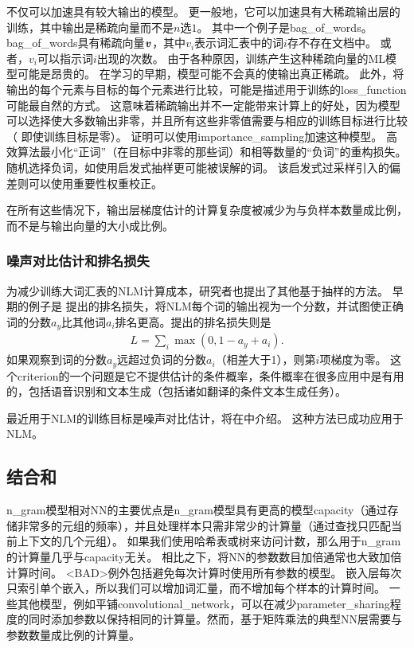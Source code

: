 不仅可以加速具有较大输出的模型。
更一般地，它可以加速具有大稀疏输出层的训练，其中输出是稀疏向量而不是$n$选$1$。
其中一个例子是\gls{bag_of_words}。
\gls{bag_of_words}具有稀疏向量$\boldsymbol{\mathit{v}}$，其中$v_i$表示词汇表中的词$i$存不存在文档中。
或者，$v_i$可以指示词$i$出现的次数。
由于各种原因，训练产生这种稀疏向量的\gls{ML}模型可能是昂贵的。
在学习的早期，模型可能不会真的使输出真正稀疏。
此外，将输出的每个元素与目标的每个元素进行比较，可能是描述用于训练的\gls{loss_function}可能最自然的方式。
这意味着稀疏输出并不一定能带来计算上的好处，因为模型可以选择使大多数输出非零，并且所有这些非零值需要与相应的训练目标进行比较（ 即使训练目标是零）。
\citet{Dauphin2011-small} 证明可以使用\gls{importance_sampling}加速这种模型。
高效算法最小化``正词''（在目标中非零的那些词）和相等数量的``负词''的重构损失。
随机选择负词，如使用启发式抽样更可能被误解的词。
该启发式过采样引入的偏差则可以使用重要性权重校正。


在所有这些情况下，输出层梯度估计的计算复杂度被减少为与负样本数量成比例，而不是与输出向量的大小成比例。


\subsubsection{噪声对比估计和排名损失}


\label{sec:combining_neural_language_models_with_n_grams}
为减少训练大词汇表的\gls{NLM}计算成本，研究者也提出了其他基于抽样的方法。
早期的例子是 \citet{Collobert+Weston-ICML2008}提出的排名损失，将\gls{NLM}每个词的输出视为一个分数，并试图使正确词的分数$a_y$比其他词$a_i$排名更高。提出的排名损失则是
\begin{align} 
 L = \sum_i \max(0,1-a_y+a_i).
\end{align} 
如果观察到词的分数$a_y$远超过负词的分数$a_i$（相差大于1），则第$i$项梯度为零。
这个\gls{criterion}的一个问题是它不提供估计的条件概率，条件概率在很多应用中是有用的，包括语音识别和文本生成（包括诸如翻译的条件文本生成任务）。

最近用于\gls{NLM}的训练目标是噪声对比估计，将在中介绍。
这种方法已成功应用于\gls{NLM}\citep{Mnih+Teh-ICML2012,Mnih2013}。


\subsection{结合和}
\gls{n_gram}模型相对\gls{NN}的主要优点是\gls{n_gram}模型具有更高的模型\gls{capacity}（通过存储非常多的元组的频率），并且处理样本只需非常少的计算量（通过查找只匹配当前上下文的几个元组）。
如果我们使用哈希表或树来访问计数，那么用于\gls{n_gram}的计算量几乎与\gls{capacity}无关。
相比之下，将\gls{NN}的参数数目加倍通常也大致加倍计算时间。
<BAD>例外包括避免每次计算时使用所有参数的模型。
嵌入层每次只索引单个嵌入，所以我们可以增加词汇量，而不增加每个样本的计算时间。
一些其他模型，例如平铺\gls{convolutional_network}，可以在减少\gls{parameter_sharing}程度的同时添加参数以保持相同的计算量。然而，基于矩阵乘法的典型\gls{NN}层需要与参数数量成比例的计算量。

